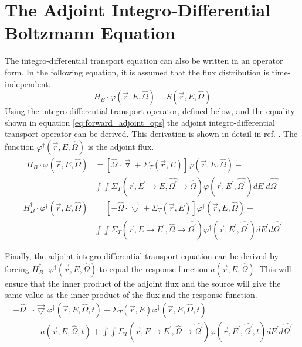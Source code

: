 \section{The Adjoint Integro-Differential Boltzmann Equation}
The integro-differential transport equation can also be written in an
operator form. In the following equation, it is assumed that the flux 
distribution is time-independent.
\begin{equation}
  H_B \cdot \varphi(\vec{r},E,\hat{\Omega}) = S(\vec{r},E,\hat{\Omega})
\end{equation}
Using the integro-differential transport operator, defined below, and the 
equality shown in equation \ref{eq:forward_adjoint_ops} the adjoint 
integro-differential transport operator can be derived. This derivation is shown
in detail in ref. \citep{lewis_computational_1993}. The function 
$\varphi^{\dagger}(\vec{r},E,\hat{\Omega})$ is the adjoint flux.
\begin{equation}
  \begin{split}
    H_B \cdot \varphi(\vec{r},E,\hat{\Omega}) &= 
    \left[ \hat{\Omega} \cdot \vec{\triangledown} +
     \Sigma_T(\vec{r},E) \right] \varphi(\vec{r},E,\hat{\Omega}) - \\
     & \int\int \Sigma_T(\vec{r},E^{'} \to E,\hat{\Omega^{'}} \to \hat{\Omega})
    \varphi(\vec{r},E^{'},\hat{\Omega^{'}}) dE^{'} d\hat{\Omega^{'}}
  \end{split}
  \label{eq:integro_diff_trans_op}
\end{equation}
\begin{equation}
  \begin{split}
    H_B^{\dagger} \cdot \varphi^{\dagger}(\vec{r},E,\hat{\Omega}) &= 
    \left[ -\hat{\Omega} \cdot \vec{\bigtriangledown} +
     \Sigma_T(\vec{r},E) \right] \varphi^{\dagger}(\vec{r},E,\hat{\Omega}) - \\
     & \int\int \Sigma_T(\vec{r},E \to E^{'},\hat{\Omega} \to \hat{\Omega^{'}})
    \varphi^{\dagger}(\vec{r},E^{'},\hat{\Omega^{'}}) dE^{'} d\hat{\Omega^{'}}
  \end{split}
  \label{eq:integro_diff_adj_trans_op}
\end{equation}

Finally, the adjoint integro-differential transport equation can be derived by
forcing $H_B^{\dagger} \cdot \varphi^{\dagger}(\vec{r},E,\hat{\Omega})$ to equal
the response function $a(\vec{r},E,\hat{\Omega})$. This will ensure that the
inner product of the adjoint flux and the source will give the same value as
the inner product of the flux and the response function.
\begin{equation}
  \begin{split}
    -\hat{\Omega} &\cdot \vec{\bigtriangledown} 
    \varphi^{\dagger}(\vec{r},E,\hat{\Omega},t)
    + \Sigma_T(\vec{r},E) \varphi^{\dagger}(\vec{r},E,\hat{\Omega},t) = \\
    & \quad a(\vec{r},E,\hat{\Omega},t) +
    \int\int \Sigma_T(\vec{r},E \to E^{'},\hat{\Omega} \to \hat{\Omega^{'}})
    \varphi(\vec{r},E^{'},\hat{\Omega^{'}},t) dE^{'}d\hat{\Omega^{'}} 
  \end{split}
  \label{eq:integro_diff_adj_boltzmann_eqn}
\end{equation}

